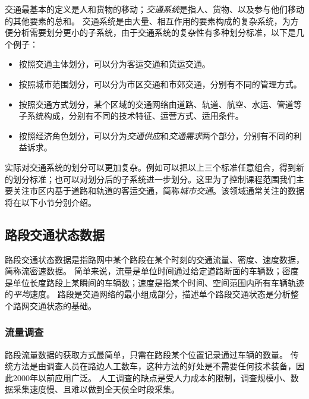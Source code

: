 交通最基本的定义是人和货物的移动；\emph{交通系统}是指人、货物、以及参与他们移动的其他要素的总和。
交通系统是由大量、相互作用的要素构成的复杂系统，为方便分析需要划分更小的子系统，由于交通系统的复杂性有多种划分标准，以下是几个例子：
\begin{itemize}
    \item 按照交通主体划分，可以分为客运交通和货运交通。
    \item 按照城市范围划分，可以分为市区交通和市郊交通，分别有不同的管理方式。
    \item 按照交通方式划分，某个区域的交通网络由道路、轨道、航空、水运、管道等子系统构成，分别有不同的技术特征、运营方式、适用条件。
    \item 按照经济角色划分，可以分为\emph{交通供应}和\emph{交通需求}两个部分，分别有不同的利益诉求。
\end{itemize}
实际对交通系统的划分可以更加复杂。例如可以把以上三个标准任意组合，得到新的划分标准；也可以对划分后的子系统进一步划分。这里为了控制课程范围我们主要关注市区内基于道路和轨道的客运交通，简称\emph{城市交通}。该领域通常关注的数据将在以下小节分别介绍。

\subsection{路段交通状态数据}

路段交通状态数据是指路网中某个路段在某个时刻的交通流量、密度、速度数据，简称流密速数据。
简单来说，流量是单位时间通过给定道路断面的车辆数；密度是单位长度路段上某瞬间的车辆数；速度是指某个时间、空间范围内所有车辆轨迹的\emph{平均}速度。
路段是交通网络的最小组成部分，描述单个路段交通状态是分析整个路网交通状态的基础。

\subsubsection{流量调查}
路段流量数据的获取方式最简单，只需在路段某个位置记录通过车辆的数量。
传统方法是由调查人员在路边人工数车，这种方法的好处是不需要任何技术装备，因此2000年以前应用广泛。
人工调查的缺点是受人力成本的限制，调查规模小、数据采集速度慢、且难以做到全天侯全时段采集。

